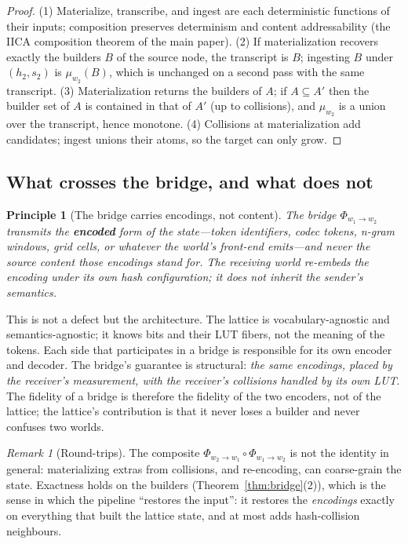 \documentclass[11pt,a4paper]{article}
\newtheorem{principle}{Principle}[section]
\theoremstyle{remark}
\newtheorem{remark}[theorem]{Remark}
\newcommand{\Bnd}{\ensuremath{\Phi}}                %
\begin{document}
\begin{proof}
(1) Materialize, transcribe, and ingest are each deterministic functions of
their inputs; composition preserves determinism and content addressability (the
IICA composition theorem of the main paper). (2) If materialization recovers
exactly the builders $B$ of the source node, the transcript is $B$; ingesting
$B$ under $(h_2,s_2)$ is $\mu_{w_2}(B)$, which is unchanged on a second pass
with the same transcript. (3) Materialization returns the builders of $A$; if
$A\subseteq A'$ then the builder set of $A$ is contained in that of $A'$ (up to
collisions), and $\mu_{w_2}$ is a union over the transcript, hence monotone.
(4) Collisions at materialization add candidates; ingest unions their atoms, so
the target can only grow.
\end{proof}

\subsection{What crosses the bridge, and what does not}

\begin{principle}[The bridge carries encodings, not content]
\label{prin:encodings}
The bridge $\Bnd_{w_1\to w_2}$ transmits the \textbf{encoded} form of the
state---token identifiers, codec tokens, n-gram windows, grid cells, or whatever
the world's front-end emits---and never the source content those encodings stand
for. The receiving world re-embeds the encoding under its own hash
configuration; it does not inherit the sender's semantics.
\end{principle}

This is not a defect but the architecture. The lattice is vocabulary-agnostic
and semantics-agnostic; it knows bits and their LUT fibers, not the meaning of
the tokens. Each side that participates in a bridge is responsible for its own
encoder and decoder. The bridge's guarantee is structural: \emph{the same
encodings, placed by the receiver's measurement, with the receiver's collisions
handled by its own LUT}. The fidelity of a bridge is therefore the fidelity of
the two encoders, not of the lattice; the lattice's contribution is that it
never loses a builder and never confuses two worlds.

\begin{remark}[Round-trips]
The composite $\Bnd_{w_2\to w_1}\circ\Bnd_{w_1\to w_2}$ is not the identity in
general: materializing extras from collisions, and re-encoding, can coarse-grain
the state. Exactness holds on the builders (Theorem~\ref{thm:bridge}(2)),
which is the sense in which the pipeline ``restores the input'': it restores the
\emph{encodings} exactly on everything that built the lattice state, and at most
adds hash-collision neighbours.
\end{remark}
\end{document}
